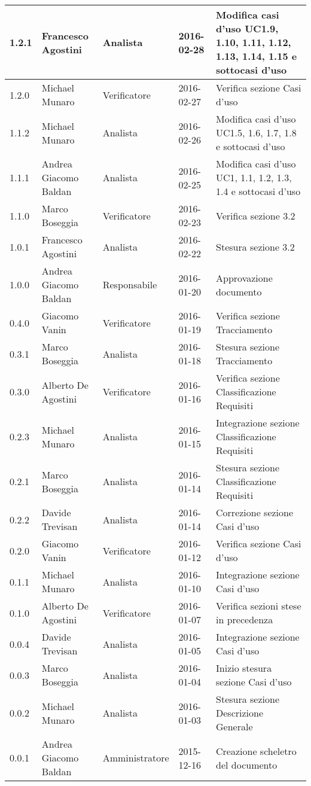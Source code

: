 \documentclass{scalatekids-article}
\begin{document}
\begin{center}
\begin{longtable}{| l | l | l | l | p{5cm} |}
    \hline
    1.2.1 & Francesco Agostini & Analista & 2016-02-28 & Modifica casi d'uso UC1.9, 1.10, 1.11, 1.12, 1.13, 1.14, 1.15 e sottocasi d'uso\\
    \hline
    1.2.0 & Michael Munaro & Verificatore & 2016-02-27 & Verifica sezione Casi d'uso\\
    \hline
    1.1.2 & Michael Munaro & Analista & 2016-02-26 & Modifica casi d'uso UC1.5, 1.6, 1.7, 1.8 e sottocasi d'uso\\
    \hline
    1.1.1 & Andrea Giacomo Baldan & Analista & 2016-02-25 & Modifica casi d'uso UC1, 1.1, 1.2, 1.3, 1.4 e sottocasi d'uso\\
    \hline
    1.1.0 & Marco Boseggia & Verificatore & 2016-02-23 & Verifica sezione 3.2\\
    \hline
    1.0.1 & Francesco Agostini & Analista & 2016-02-22 & Stesura sezione 3.2\\
    \hline
    1.0.0 & Andrea Giacomo Baldan & Responsabile & 2016-01-20 & Approvazione documento\\
    \hline
    0.4.0 & Giacomo Vanin & Verificatore & 2016-01-19 & Verifica sezione Tracciamento\\
    \hline
    0.3.1 & Marco Boseggia & Analista & 2016-01-18 & Stesura sezione Tracciamento\\
    \hline
    0.3.0 & Alberto De Agostini & Verificatore & 2016-01-16 & Verifica sezione Classificazione Requisiti\\
    \hline
    0.2.3 & Michael Munaro & Analista & 2016-01-15 & Integrazione sezione Classificazione Requisiti\\
    \hline
    0.2.1 & Marco Boseggia & Analista & 2016-01-14 & Stesura sezione Classificazione Requisiti\\
    \hline
    0.2.2 & Davide Trevisan & Analista & 2016-01-14 & Correzione sezione Casi d'uso\\
    \hline
    0.2.0 & Giacomo Vanin & Verificatore & 2016-01-12 & Verifica sezione Casi d'uso\\
    \hline
    0.1.1 & Michael Munaro & Analista & 2016-01-10 & Integrazione sezione Casi d'uso\\
    \hline
    0.1.0 & Alberto De Agostini & Verificatore & 2016-01-07 & Verifica sezioni stese in precedenza\\
    \hline
    0.0.4 & Davide Trevisan & Analista & 2016-01-05 & Integrazione sezione Casi d'uso\\
    \hline
    0.0.3 & Marco Boseggia & Analista & 2016-01-04 & Inizio stesura sezione Casi d'uso\\
    \hline
    0.0.2 & Michael Munaro & Analista & 2016-01-03 & Stesura sezione Descrizione Generale\\
    \hline
    0.0.1 & Andrea Giacomo Baldan & Amministratore & 2015-12-16 & Creazione scheletro del documento\\
    \hline
  \end{longtable}
\end{center}
\tableofcontents
\newpage
{}
\end{document}

